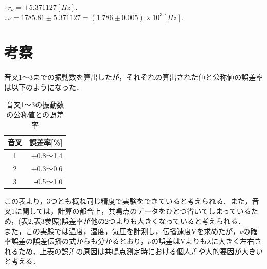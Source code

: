 \documentclass[a4paper,1pt]{jsarticle}
\begin{document}
$\therefore r_\nu = \pm 5.371127[Hz].$\\

$\therefore \nu =1785.81\pm5.371127=(1.786\pm0.005)\times10^3[Hz].$








\section{考察}

音叉1〜3までの振動数を算出したが，それぞれの算出された値と公称値の誤差率は以下のようになった．\\

\begin{table}[H]
  \caption{音叉1〜3の振動数の公称値との誤差率}
  \label{table:SpeedOfLight}
  \centering
  \begin{tabular}{c|r}
    
    音叉 & 誤差率[\%]\\
    \hline
    
    1 & +0.8〜1.4 \\
    2 & +0.3〜0.6 \\
    3 & -0.5〜1.0 \\
    
    

    
   
  \end{tabular}


\end{table}

この表より，3つとも概ね同じ精度で実験をできていると考えられる．また，音叉1に関しては，計算の都合上，共鳴点のデータをひとつ省いてしまっているため，(表2,表3参照)誤差率が他の2つよりも大きくなっていると考えられる．\\

また，この実験では温度，湿度，気圧を計測し，伝播速度Vを求めたが，$\nu $の確率誤差の誤差伝播の式からも分かるとおり，$\nu $の誤差はVよりも$\lambda $に大きく左右されるため，上表の誤差の原因は共鳴点測定時における個人差や人的要因が大きいと考える．
\end{document}
